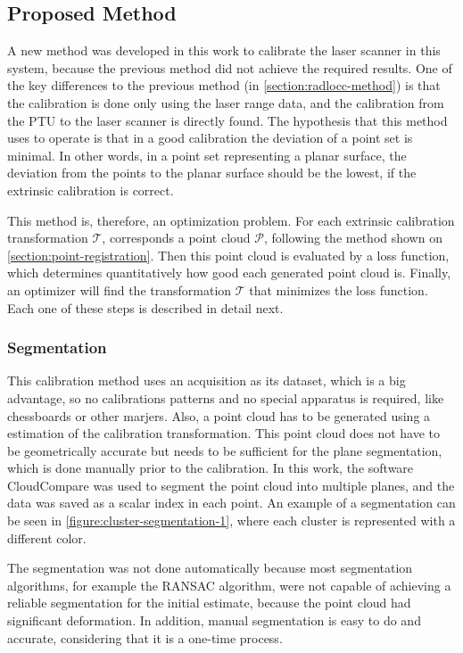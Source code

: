 \subsection{Proposed Method}
\label{section:proposed-method}

A new method was developed in this work to calibrate the laser scanner in this system, because the previous method did not achieve the required results. One of the key differences to the previous method (in \cref{section:radlocc-method}) is that the calibration is done only using the laser range data, and the calibration from the PTU to the laser scanner is directly found. The hypothesis that this method uses to operate is that in a good calibration the deviation of a point set is minimal. In other words, in a point set representing a planar surface, the deviation from the points to the planar surface should be the lowest, if the extrinsic calibration is correct.

This method is, therefore, an optimization problem. For each extrinsic calibration transformation $\mathcal{T}$, corresponds a point cloud $\mathcal{P}$, following the method shown on \cref{section:point-registration}. Then this point cloud is evaluated by a loss function, which determines quantitatively how good each generated point cloud is. Finally, an optimizer will find the transformation $\mathcal{T}$ that minimizes the loss function. Each one of these steps is described in detail next.

\subsubsection{Segmentation}

This calibration method uses an acquisition as its dataset, which is a big advantage, so no calibrations patterns and no special apparatus is required, like chessboards or other marjers. Also, a point cloud has to be generated using a estimation of the calibration transformation. This point cloud does not have to be geometrically accurate but needs to be sufficient for the plane segmentation, which is done manually prior to the calibration. In this work, the software CloudCompare was used to segment the point cloud into multiple planes, and the data was saved as a scalar index in each point. An example of a segmentation can be seen in \cref{figure:cluster-segmentation-1}, where each cluster is represented with a different color.

The segmentation was not done automatically because most segmentation algorithms, for example the RANSAC algorithm, were not capable of achieving a reliable segmentation for the initial estimate, because the point cloud had significant deformation. In addition, manual segmentation is easy to do and accurate, considering that it is a one-time process.

